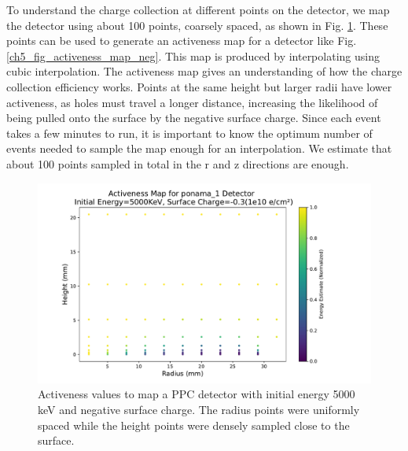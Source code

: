 To understand the charge collection at different points on the detector, we map the detector using about 100 points, coarsely spaced, as shown in Fig. \ref{ch5_fig_activeness_points_neg}. These points can be used to generate an activeness map for a detector like Fig. \ref{ch5_fig_activeness_map_neg}. This map is produced by interpolating using cubic interpolation. The activeness map gives an understanding of how the charge collection efficiency works. Points at the same height but larger radii have lower activeness, as holes must travel a longer distance, increasing the likelihood of being pulled onto the surface by the negative surface charge. Since each event takes a few minutes to run, it is important to know the optimum number of events needed to sample the map enough for an interpolation. We estimate that about 100 points sampled in total in the r and z directions are enough.

\begin{figure}%
\includegraphics[trim={0cm 0.5cm 3.2cm 1.15cm},clip,width=0.9\linewidth]{ch5/figs/activenss_map_ponama_1_-0.3.pdf}
\caption{Activeness values to map a PPC detector \ehd with initial energy 5000 keV and negative surface charge. The radius points were uniformly spaced while the height points were densely sampled close to the surface.}
\label{ch5_fig_activeness_points_neg}
\end{figure}

